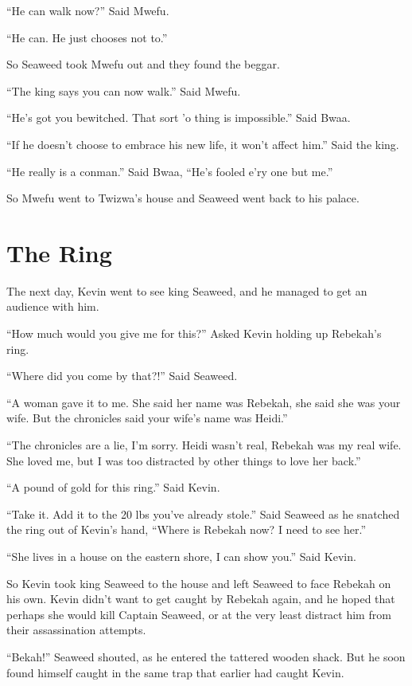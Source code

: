 ``He can walk now?'' Said Mwe\-fu.

``He can. He just chooses not to.''

So Seaweed took Mwe\-fu out and they found the beggar.

``The king says you can now walk.'' Said Mwe\-fu.

``He's got you bewitched. That sort 'o thing is impossible.'' Said Bwaa.

``If he doesn't choose to embrace his new life, it won't affect him.'' Said the king.

``He really is a conman.'' Said Bwaa, ``He's fooled e'ry one but me.''

So Mwe\-fu went to Twi\-zwa's house and Seaweed went back to his palace.

\section{The Ring}
The next day, Kevin went to see king Seaweed, and he managed to get an audience with him.

``How much would you give me for this?'' Asked Kevin holding up Rebekah's ring.

``Where did you come by that?!'' Said Seaweed.

``A woman gave it to me. She said her name was Rebekah, she said she was your wife. But the chronicles said your wife's name was Heidi.''

``The chronicles are a lie, I'm sorry.
Heidi wasn't real, Rebekah was my real wife.
She loved me, but I was too distracted by other things to love her back.''

``A pound of gold for this ring.'' Said Kevin.

``Take it. Add it to the 20 lbs you've already stole.'' Said Seaweed as he snatched the ring out of Kevin's hand, ``Where is Rebekah now? I need to see her.''

``She lives in a house on the eastern shore, I can show you.'' Said Kevin.

So Kevin took king Seaweed to the house and left Seaweed to face Rebekah on his own. Kevin didn't want to get caught by Rebekah again, and he hoped that perhaps she would kill Captain Seaweed, or at the very least distract him from their assassination attempts.

``Bekah!'' Seaweed shouted, as he entered the tattered wooden shack. But he soon found himself caught in the same trap that earlier had caught Kevin.

